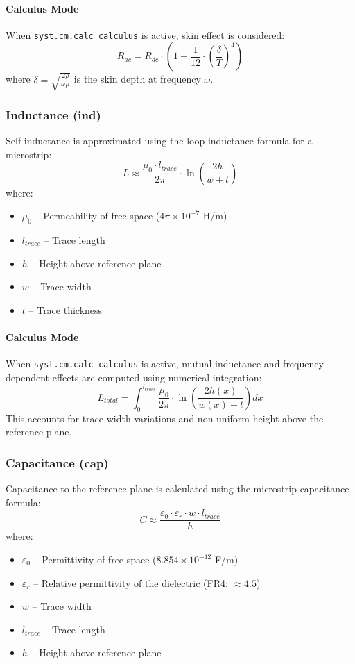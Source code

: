 \paragraph{Calculus Mode}
When \texttt{syst.cm.calc calculus} is active, skin effect is considered:
\begin{equation}
R_{ac} = R_{dc} \cdot \left(1 + \frac{1}{12} \cdot \left(\frac{\delta}{T}\right)^4\right)
\end{equation}
where $\delta = \sqrt{\frac{2\rho}{\omega\mu}}$ is the skin depth at frequency $\omega$.

\subsubsection{Inductance (ind)}
Self-inductance is approximated using the loop inductance formula for a microstrip:
\begin{equation}
L \approx \frac{\mu_0 \cdot l_{trace}}{2\pi} \cdot \ln\left(\frac{2h}{w + t}\right)
\end{equation}
where:
\begin{itemize}
\item $\mu_0$ -- Permeability of free space ($4\pi \times 10^{-7}$ H/m)
\item $l_{trace}$ -- Trace length
\item $h$ -- Height above reference plane
\item $w$ -- Trace width
\item $t$ -- Trace thickness
\end{itemize}

\paragraph{Calculus Mode}
When \texttt{syst.cm.calc calculus} is active, mutual inductance and frequency-dependent effects are computed using numerical integration:
\begin{equation}
L_{total} = \int_0^{l_{trace}} \frac{\mu_0}{2\pi} \cdot \ln\left(\frac{2h(x)}{w(x) + t}\right) dx
\end{equation}
This accounts for trace width variations and non-uniform height above the reference plane.

\subsubsection{Capacitance (cap)}
Capacitance to the reference plane is calculated using the microstrip capacitance formula:
\begin{equation}
C \approx \frac{\varepsilon_0 \cdot \varepsilon_r \cdot w \cdot l_{trace}}{h}
\end{equation}
where:
\begin{itemize}
\item $\varepsilon_0$ -- Permittivity of free space ($8.854 \times 10^{-12}$ F/m)
\item $\varepsilon_r$ -- Relative permittivity of the dielectric (FR4: $\approx 4.5$)
\item $w$ -- Trace width
\item $l_{trace}$ -- Trace length
\item $h$ -- Height above reference plane
\end{itemize}

